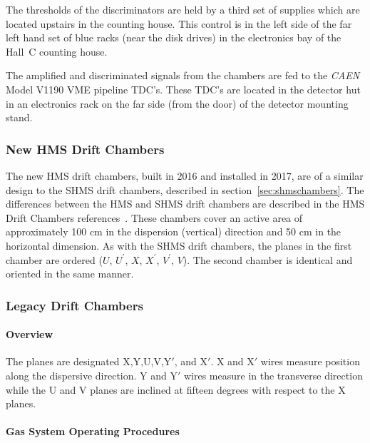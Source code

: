 {The thresholds of the discriminators are held by a third set of supplies
which are located upstairs in the counting house. This control
is in the left side of the far left hand set of blue racks (near the disk drives) in the
electronics bay of the Hall~C counting house.

The amplified and discriminated signals from the chambers are fed
to the {\em CAEN} Model V1190 VME pipeline TDC's. These
TDC's are located in the detector hut in an electronics rack on the
far side (from the door) of the detector mounting stand.


\subsubsection{New HMS Drift Chambers}
The new HMS drift chambers, built in 2016 and installed in 2017,
are of a similar design to the SHMS
drift chambers, described in section~\ref{sec:shmschambers}.
The differences between the HMS and SHMS drift chambers are
described in the HMS Drift Chambers references~\cite{howto:hms_drift_chambers}.
These chambers
cover an active area of approximately 100 cm in the dispersion (vertical)
direction and 50 cm in the horizontal dimension.   As with the SHMS
drift chambers, the planes in the first chamber are ordered
($U$, $U^{\prime}$, $X$, $X^{\prime}$, $V^{\prime}$, $V$).  The second
chamber is identical and oriented in the same manner.

\subsubsection{Legacy Drift Chambers}
\label{sec:legacydriftchambers}
\paragraph{Overview}


The planes are designated X,Y,U,V,Y$'$, and X$'$.
X and X$'$ wires measure position along the dispersive direction.
Y and Y$'$ wires measure in the transverse direction while
the U and V planes are inclined at fifteen degrees with respect to the
X planes.

\paragraph {Gas System Operating Procedures}

}
